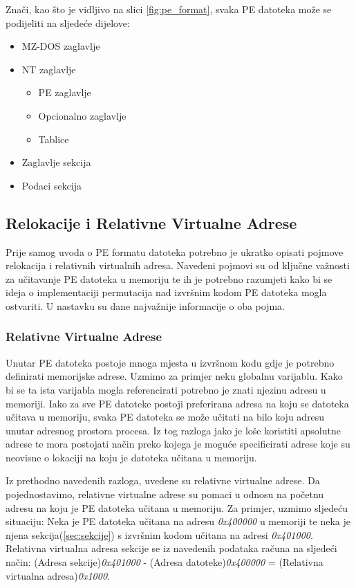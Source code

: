 \documentclass[times, utf8, diplomski, numeric]{fer}
\begin{document}
\pagebreak
Znači, kao što je vidljivo na slici \ref{fig:pe_format}, svaka PE datoteka može se podijeliti na sljedeće dijelove:
\begin{itemize}
\item MZ-DOS zaglavlje
\item NT zaglavlje
	\begin{itemize}
	\item PE zaglavlje
	\item Opcionalno zaglavlje
	\item Tablice
	\end{itemize}
\item Zaglavlje sekcija
\item Podaci sekcija
\end{itemize}
\pagebreak

\subsection{Relokacije i Relativne Virtualne Adrese}
Prije samog uvoda o PE formatu datoteka potrebno je ukratko opisati pojmove relokacija i relativnih virtualnih adresa. Navedeni pojmovi su od ključne važnosti za učitavanje PE datoteka u memoriju te ih je potrebno razumjeti kako bi se ideja o implementaciji permutacija nad izvršnim kodom PE datoteka mogla ostvariti. U nastavku su dane najvažnije informacije o oba pojma.

\subsubsection{Relativne Virtualne Adrese}
\label{sct:rva}
Unutar PE datoteka postoje mnoga mjesta u izvršnom kodu gdje je potrebno definirati memorijske adrese. Uzmimo za primjer neku globalnu varijablu. Kako bi se ta ista varijabla mogla referencirati potrebno je znati njezinu adresu u memoriji. Iako za sve PE datoteke postoji preferirana adresa na koju se datoteka učitava u memoriju, svaka PE datoteka se može učitati na bilo koju adresu unutar adresnog prostora procesa. Iz tog razloga jako je loše koristiti apsolutne adrese te mora postojati način preko kojega je moguće specificirati adrese koje su neovisne o lokaciji na koju je datoteka učitana u memoriju.

Iz prethodno navedenih razloga, uvedene su relativne virtualne adrese. Da pojednostavimo, relativne virtualne adrese su pomaci u odnosu na početnu adresu na koju je PE datoteka učitana u memoriju. Za primjer, uzmimo sljedeću situaciju: Neka je PE datoteka učitana na adresu \emph{0x400000} u memoriji te neka je njena sekcija(\ref{sec:sekcije}) s izvršnim kodom učitana na adresi \emph{0x401000}. Relativna virtualna adresa sekcije se iz navedenih podataka računa na sljedeći način: (Adresa sekcije)\emph{0x401000} - (Adresa datoteke)\emph{0x400000} = (Relativna virtualna adresa)\emph{0x1000}.
\end{document}
